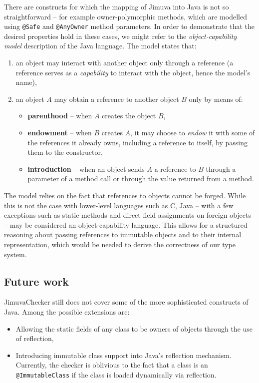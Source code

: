 \documentclass{pracamgr}
\theoremstyle{break}
\theoremstyle{break}
\theoremstyle{break}
\begin{document}
There are constructs for which the mapping of Jimuva into Java is not
so straightforward -- for example owner-polymorphic methods, which are
modelled using \texttt{@Safe} and \texttt{@AnyOwner} method
parameters. In order to demonstrate that the desired properties hold
in these cases, we might refer to the \emph{object-capability model}
description \cite{object-cap} of the Java language. The model states
that:
\begin{enumerate}
\item an object may interact with another object only through a
  reference (a reference serves as a \emph{capability} to interact
  with the object, hence the model's name),
\item an object $A$ may obtain a reference to another object $B$ only
  by means of:
  \begin{itemize}
  \item \textbf{parenthood} -- when $A$ creates the object $B$, 
  \item \textbf{endowment} -- when $B$ creates $A$, it may choose to
    \emph{endow} it with some of the references it already owns,
    including a reference to itself, by passing them to the
    constructor,
  \item \textbf{introduction} -- when an object sends $A$ a reference
    to $B$ through a parameter of a method call or through the value
    returned from a method.
  \end{itemize}
\end{enumerate}
The model relies on the fact that references to objects cannot be
forged. While this is not the case with lower-level languages such as
C, Java -- with a few exceptions such as static methods and direct
field assignments on foreign objects -- may be considered an
object-capability language. This allows for a structured reasoning
about passing references to immutable objects and to their internal
representation, which would be needed to derive the correctness of our
type system.

\subsection{Future work}

JimuvaChecker still does not cover some of the more sophisticated
constructs of Java. Among the possible extensions are:
\begin{itemize}
\item Allowing the static fields of any class to be owners of objects
  through the use of reflection, 
\item Introducing immutable class support into Java's reflection
  mechanism. Currently, the checker is oblivious to the fact that a
  class is an \texttt{@ImmutableClass} if the class is loaded
  dynamically via reflection.
\end{itemize}
\end{document}
